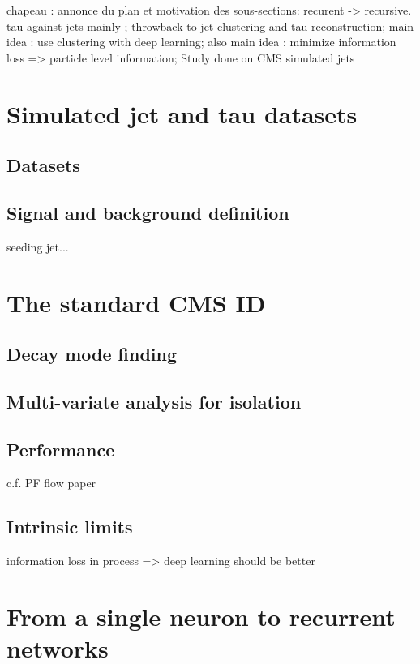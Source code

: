 chapeau : annonce du plan et motivation des sous-sections: recurent -> recursive.
tau against jets mainly ; throwback to jet clustering and tau reconstruction; main idea : use clustering with deep learning; also main idea : minimize information loss => particle level information; Study done on CMS simulated jets

\section{Simulated jet and tau datasets}

\subsection{Datasets}

\subsection{Signal and background definition}

seeding jet...

\section{The standard CMS \tauh ID}

\subsection{Decay mode finding}

\subsection{Multi-variate analysis for isolation}

\subsection{Performance}

c.f. PF flow paper

\subsection{Intrinsic limits}

information loss in process => deep learning should be better

\section{From a single neuron to recurrent networks}

